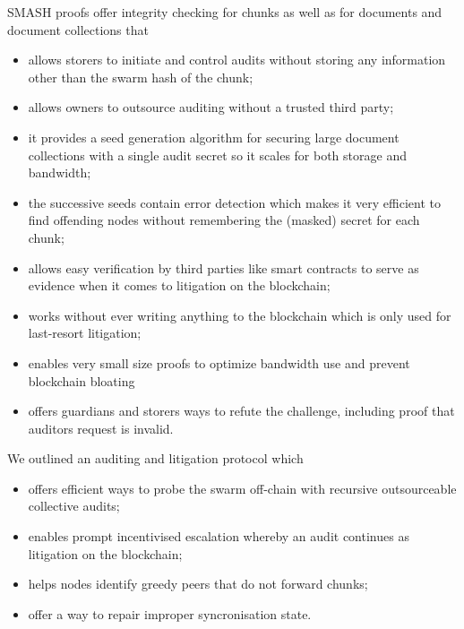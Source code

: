 \documentclass[12pt]{article}
\begin{document}
{SMASH proofs offer integrity checking for chunks as well as for documents and document collections that

\begin{itemize}
\item  allows storers to initiate and control audits without storing any information other than the swarm hash of the chunk;
\item  allows owners to outsource auditing without a trusted third party;
\item  it provides a seed generation algorithm for securing large document collections with a single audit secret so it scales for both storage and bandwidth;
\item  the successive seeds contain error detection which makes it very efficient to find offending nodes without remembering the (masked) secret for each chunk;
\item  allows easy verification by third parties like smart contracts to serve as evidence  when it comes to litigation on the blockchain;
\item  works without ever writing anything to the blockchain which is only used for last-resort litigation;
\item  enables very small size proofs to optimize bandwidth use and prevent blockchain bloating
\item  offers guardians and storers ways to refute the challenge, including proof that auditors request is invalid.
\end{itemize}

We outlined an auditing and litigation protocol which

\begin{itemize}
\item  offers efficient ways to probe the swarm off-chain with recursive outsourceable collective audits;
\item  enables prompt incentivised escalation whereby an audit continues as litigation on the blockchain;
\item  helps nodes identify greedy peers that do not forward chunks;
\item  offer a way to repair improper syncronisation state.
\end{itemize}

}
\end{document}
